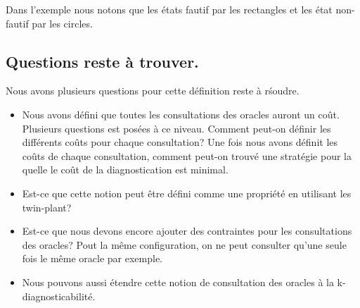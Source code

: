 \documentclass[a4paper,10pt]{article}
\begin{document}
Dans l'exemple nous notons que les \'etats fautif par les rectangles et les \'etat non-fautif par les circles.

\subsection{Questions reste \`a trouver.}

Nous avons plusieurs questions pour cette d\'efinition reste \`a r\'soudre.

\begin{itemize}
\item Nous avons d\'efini que toutes les consultations des oracles auront un co\^ut. Plusieurs questions est pos\'ees \`a ce niveau. Comment peut-on d\'efinir les diff\'erents co\^uts pour chaque consultation? Une fois nous avons d\'efinit les co\^uts de chaque consultation, comment peut-on trouv\'e une strat\'egie pour la quelle le co\^ut de la diagnostication est minimal.

\item Est-ce que cette notion peut \^etre d\'efini comme une propri\'et\'e en utilisant les twin-plant?

\item Est-ce que nous devons encore ajouter des contraintes pour les consultations des oracles? Pout la m\^eme configuration, on ne peut consulter qu'une seule fois le m\^eme oracle par exemple.

\item Nous pouvons aussi \'etendre cette notion de consultation des oracles \`a la k-diagnosticabilit\'e.
\end{itemize}
\end{document}
